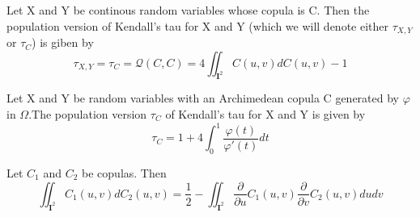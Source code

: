 \begin{theorem}
    Let X and Y be continous random variables whose copula is C. Then the population version of Kendall's tau for X and Y (which we will denote either $\tau_{X,Y}$ or $\tau_C$) is giben by
    \begin{equation}
        \tau_{X,Y} = \tau_C = \mathcal{Q}(C,C) = 4 \iint_{\mathbf{I}^2} C(u,v)dC(u,v)-1
        \label{eq-tau1}
    \end{equation}
    \label{thr-tau}
\end{theorem}

\begin{corollary}
    Let X and Y be random variables with an Archimedean copula C generated by $\varphi$ in $\Omega$.The population version $\tau_C$ of Kendall's tau for X and Y is given by
    \begin{equation}
        \tau_C = 1+4\int_0^1\dfrac{\varphi(t)}{\varphi'(t)}dt
        \label{eq5.1.9}
    \end{equation}
    \label{cor5.1.4}
\end{corollary}
\begin{theorem}
    Let $C_1$ and $C_2$ be copulas. Then 
    \begin{equation}
        \iint_{\mathbf{I}^2}C_1(u,v)dC_2(u,v) = \dfrac{1}{2}-\iint_{\mathbf{I}^2}\dfrac{\partial}{\partial u} C_1(u,v)\dfrac{\partial}{\partial v}C_2(u,v)dudv
        \label{eq5.1.13}
    \end{equation}
    \label{thr5.1.5}
\end{theorem}


